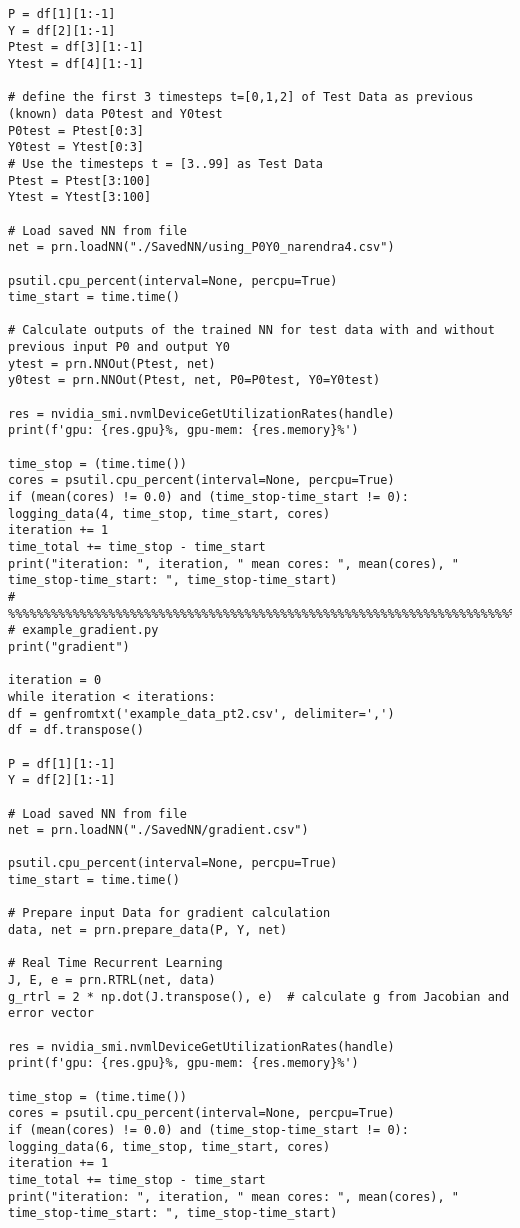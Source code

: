 \begin{lstlisting}
P = df[1][1:-1]
Y = df[2][1:-1]
Ptest = df[3][1:-1]
Ytest = df[4][1:-1]

# define the first 3 timesteps t=[0,1,2] of Test Data as previous (known) data P0test and Y0test
P0test = Ptest[0:3]
Y0test = Ytest[0:3]
# Use the timesteps t = [3..99] as Test Data
Ptest = Ptest[3:100]
Ytest = Ytest[3:100]

# Load saved NN from file
net = prn.loadNN("./SavedNN/using_P0Y0_narendra4.csv")

psutil.cpu_percent(interval=None, percpu=True)
time_start = time.time()

# Calculate outputs of the trained NN for test data with and without previous input P0 and output Y0
ytest = prn.NNOut(Ptest, net)
y0test = prn.NNOut(Ptest, net, P0=P0test, Y0=Y0test)

res = nvidia_smi.nvmlDeviceGetUtilizationRates(handle)
print(f'gpu: {res.gpu}%, gpu-mem: {res.memory}%')

time_stop = (time.time())
cores = psutil.cpu_percent(interval=None, percpu=True)
if (mean(cores) != 0.0) and (time_stop-time_start != 0):
logging_data(4, time_stop, time_start, cores)
iteration += 1
time_total += time_stop - time_start
print("iteration: ", iteration, " mean cores: ", mean(cores), " time_stop-time_start: ", time_stop-time_start)
# %%%%%%%%%%%%%%%%%%%%%%%%%%%%%%%%%%%%%%%%%%%%%%%%%%%%%%%%%%%%%%%%%%%%%%%%%%%%%%%%%%%%%%%
# example_gradient.py
print("gradient")

iteration = 0
while iteration < iterations:
df = genfromtxt('example_data_pt2.csv', delimiter=',')
df = df.transpose()

P = df[1][1:-1]
Y = df[2][1:-1]

# Load saved NN from file
net = prn.loadNN("./SavedNN/gradient.csv")

psutil.cpu_percent(interval=None, percpu=True)
time_start = time.time()

# Prepare input Data for gradient calculation
data, net = prn.prepare_data(P, Y, net)

# Real Time Recurrent Learning
J, E, e = prn.RTRL(net, data)
g_rtrl = 2 * np.dot(J.transpose(), e)  # calculate g from Jacobian and error vector

res = nvidia_smi.nvmlDeviceGetUtilizationRates(handle)
print(f'gpu: {res.gpu}%, gpu-mem: {res.memory}%')

time_stop = (time.time())
cores = psutil.cpu_percent(interval=None, percpu=True)
if (mean(cores) != 0.0) and (time_stop-time_start != 0):
logging_data(6, time_stop, time_start, cores)
iteration += 1
time_total += time_stop - time_start
print("iteration: ", iteration, " mean cores: ", mean(cores), " time_stop-time_start: ", time_stop-time_start)


\end{lstlisting}
